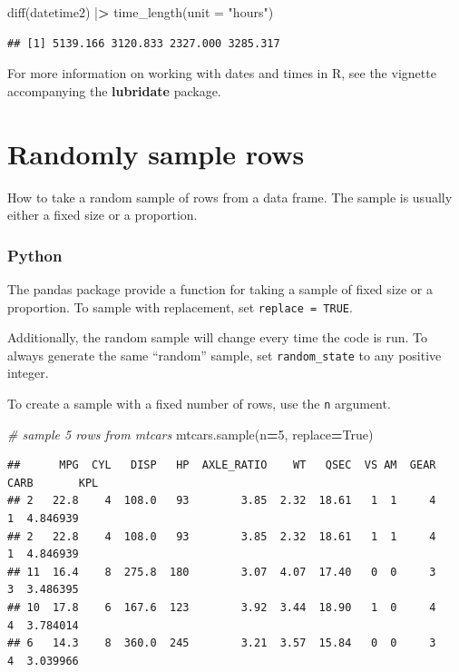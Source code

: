 \documentclass[
]{book}
\newenvironment{Shaded}{\begin{snugshade}}{\end{snugshade}}
\newcommand{\AttributeTok}[1]{\textcolor[rgb]{0.77,0.63,0.00}{#1}}
\newcommand{\CommentTok}[1]{\textcolor[rgb]{0.56,0.35,0.01}{\textit{#1}}}
\newcommand{\DecValTok}[1]{\textcolor[rgb]{0.00,0.00,0.81}{#1}}
\newcommand{\ErrorTok}[1]{\textcolor[rgb]{0.64,0.00,0.00}{\textbf{#1}}}
\newcommand{\FunctionTok}[1]{\textcolor[rgb]{0.00,0.00,0.00}{#1}}
\newcommand{\NormalTok}[1]{#1}
\newcommand{\OperatorTok}[1]{\textcolor[rgb]{0.81,0.36,0.00}{\textbf{#1}}}
\newcommand{\SpecialCharTok}[1]{\textcolor[rgb]{0.00,0.00,0.00}{#1}}
\newcommand{\StringTok}[1]{\textcolor[rgb]{0.31,0.60,0.02}{#1}}
\newcommand{\VariableTok}[1]{\textcolor[rgb]{0.00,0.00,0.00}{#1}}
\begin{document}
\begin{Shaded}
\begin{Highlighting}[]
\FunctionTok{diff}\NormalTok{(datetime2) }\SpecialCharTok{|}\ErrorTok{\textgreater{}} \FunctionTok{time\_length}\NormalTok{(}\AttributeTok{unit =} \StringTok{"hours"}\NormalTok{)}
\end{Highlighting}
\end{Shaded}

\begin{verbatim}
## [1] 5139.166 3120.833 2327.000 3285.317
\end{verbatim}

For more information on working with dates and times in R, see the vignette accompanying the \textbf{lubridate} package.

\hypertarget{randomly-sample-rows}{%
\section{Randomly sample rows}\label{randomly-sample-rows}}

How to take a random sample of rows from a data frame. The sample is usually either a fixed size or a proportion.

\hypertarget{python-29}{%
\subsubsection*{Python}\label{python-29}}

The pandas package provide a function for taking a sample of fixed size or a proportion. To sample with replacement, set \texttt{replace\ =\ TRUE}.

Additionally, the random sample will change every time the code is run. To always generate the same ``random'' sample, set \texttt{random\_state} to any positive integer.

To create a sample with a fixed number of rows, use the \texttt{n} argument.

\begin{Shaded}
\begin{Highlighting}[]
\CommentTok{\# sample 5 rows from mtcars}
\NormalTok{mtcars.sample(n}\OperatorTok{=}\DecValTok{5}\NormalTok{, replace}\OperatorTok{=}\VariableTok{True}\NormalTok{)}
\end{Highlighting}
\end{Shaded}

\begin{verbatim}
##      MPG  CYL   DISP   HP  AXLE_RATIO    WT   QSEC  VS AM  GEAR  CARB       KPL
## 2   22.8    4  108.0   93        3.85  2.32  18.61   1  1     4     1  4.846939
## 2   22.8    4  108.0   93        3.85  2.32  18.61   1  1     4     1  4.846939
## 11  16.4    8  275.8  180        3.07  4.07  17.40   0  0     3     3  3.486395
## 10  17.8    6  167.6  123        3.92  3.44  18.90   1  0     4     4  3.784014
## 6   14.3    8  360.0  245        3.21  3.57  15.84   0  0     3     4  3.039966
\end{verbatim}
\end{document}
